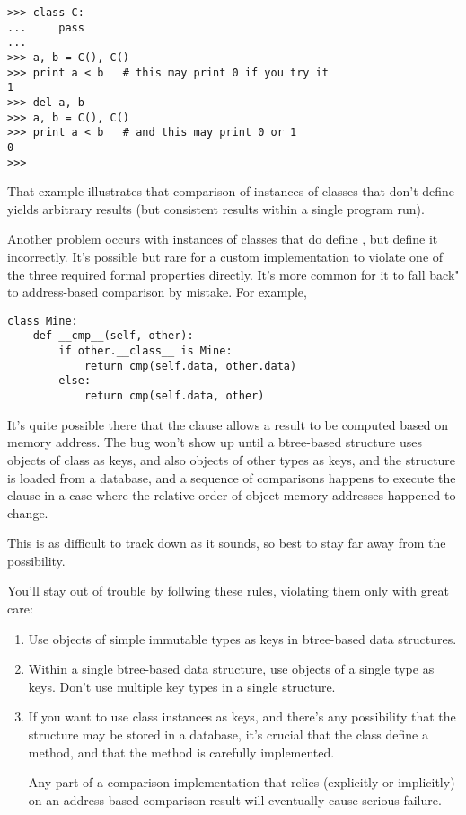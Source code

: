 \begin{verbatim}
>>> class C:
...     pass
...
>>> a, b = C(), C()
>>> print a < b   # this may print 0 if you try it
1
>>> del a, b
>>> a, b = C(), C()
>>> print a < b   # and this may print 0 or 1
0
>>>
\end{verbatim}

That example illustrates that comparison of instances of classes that
don't define  yields arbitrary results (but consistent
results within a single program run).

Another problem occurs with instances of classes that do define
, but define it incorrectly.  It's possible but
rare for a custom  implementation to violate one
of the three required formal properties directly.  It's more common for
it to fall back" to address-based comparison by mistake.
For example,

\begin{verbatim}
class Mine:
    def __cmp__(self, other):
        if other.__class__ is Mine:
            return cmp(self.data, other.data)
        else:
            return cmp(self.data, other)
\end{verbatim}

It's quite possible there that the  clause allows
a result to be computed based on memory address.  The bug won't show
up until a btree-based structure uses objects of class  as
keys, and also objects of other types as keys, and the structure is
loaded from a database, and a sequence of comparisons happens to execute
the  clause in a case where the relative order of object
memory addresses happened to change.

This is as difficult to track down as it sounds, so best to stay far
away from the possibility.

You'll stay out of trouble by follwing these rules, violating them
only with great care:

\begin{enumerate}
\item  Use objects of simple immutable types as keys in
       btree-based data structures.

\item  Within a single btree-based data structure, use objects of
       a single type as keys.  Don't use multiple key types in a
       single structure.

\item  If you want to use class instances as keys, and there's
       any possibility that the structure may be stored in a
       database, it's crucial that the class define a
        method, and that the method is
       carefully implemented.

       Any part of a comparison implementation that relies (explicitly
       or implicitly) on an address-based comparison result will
       eventually cause serious failure.
\end{enumerate}
